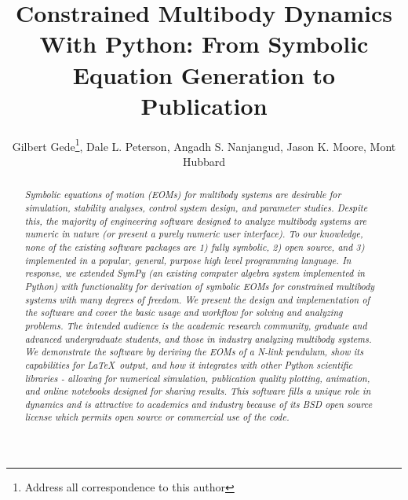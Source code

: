\documentclass[twocolumn,10pt, final]{asme2e}
\title{Constrained Multibody Dynamics With Python: From Symbolic
Equation Generation to Publication}
\author{Gilbert Gede\thanks{Address all correspondence to this author}, Dale L.
Peterson, Angadh S. Nanjangud, Jason K. Moore, Mont Hubbard
  \affiliation{
    Sports Biomechanics Laboratory\\
    Department of Mechanical and Aerospace Engineering\\
    University of California\\
    Davis, California 95616\\
    Email: \{ggede, dlpeterson, asnanjangud, jkmoor, mhubbard\}@ucdavis.edu
  }
}
\begin{document}
\maketitle

\begin{abstract}
\it Symbolic equations of motion (EOMs) for multibody systems are desirable
for simulation, stability analyses, control system design, and parameter
studies.
Despite this, the majority of engineering software designed to analyze
multibody systems are numeric in nature (or present a purely numeric user
interface). To our knowledge, none of the existing software packages are 1)
fully symbolic, 2) open source, and 3) implemented in a popular, general,
purpose high level programming language.
In response, we extended SymPy (an existing computer algebra system implemented
in Python) with functionality for derivation of symbolic EOMs for constrained
multibody systems with many degrees of freedom.
We present the design and implementation of the software and cover the basic
usage and workflow for solving and analyzing problems. The intended audience is
the academic research community, graduate and advanced undergraduate students,
and those in industry analyzing multibody systems.
We demonstrate the software by deriving the EOMs of a N-link pendulum, show its
capabilities for \LaTeX\ output, and how it integrates with other Python
scientific libraries - allowing for numerical simulation, publication quality
plotting, animation, and online notebooks designed for sharing results.
This software fills a unique role in dynamics and is attractive to academics
and industry because of its BSD open source license which permits open source
or commercial use of the code.

\end{abstract}

\end{document}
